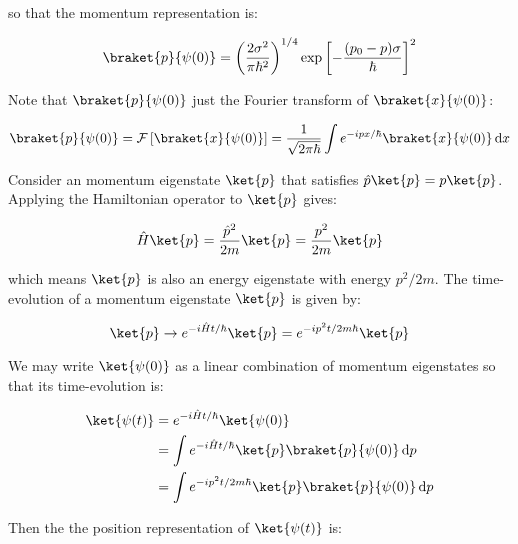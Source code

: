\documentclass[12pt]{article}
\begin{document}
so that the momentum representation is:

\begin{equation}
    \braket{p}{\psi(0)} = \left( \frac{2\sigma^{2}}{\pi \hbar^{2}} \right)^{1/4} \exp \left[ -\frac{(p_{0} - p)\sigma}{\hbar} \right]^{2}
\end{equation}

Note that $\braket{p}{\psi(0)}$ just the Fourier transform of $\braket{x}{\psi(0)}$:

\begin{equation}
    \braket{p}{\psi(0)} = \mathcal{F} \left[ \braket{x}{\psi(0)} \right] = \frac{1}{\sqrt{2\pi\hbar}} \int e^{-ipx/\hbar} \braket{x}{\psi(0)} \, \mathrm{d}x
\end{equation}

Consider an momentum eigenstate $\ket{p}$ that satisfies $\hat{p} \ket{p} = p \ket{p}$. Applying the Hamiltonian operator to $\ket{p}$ gives:

\begin{equation}
    \hat{H} \ket{p} = \frac{\hat{p}^{2}}{2m} \ket{p} = \frac{p^{2}}{2m} \ket{p}
\end{equation}

which means $\ket{p}$ is also an energy eigenstate with energy $p^{2}/2m$. The time-evolution of a momentum eigenstate $\ket{p}$ is given by:

\begin{equation}
    \ket{p} \to e^{-i\hat{H}t/\hbar} \ket{p} = e^{-ip^{2}t/2m\hbar} \ket{p}
\end{equation}

We may write $\ket{\psi(0)}$ as a linear combination of momentum eigenstates so that its time-evolution is:

\begin{equation}
\begin{split}
    \ket{\psi(t)} &= e^{-i\hat{H}t/\hbar} \ket{\psi(0)} \\
    &= \int e^{-i\hat{H}t/\hbar} \ket{p} \braket{p}{\psi(0)} \, \mathrm{d}p \\
    &= \int e^{-ip^{2}t/2m\hbar} \ket{p} \braket{p}{\psi(0)} \, \mathrm{d}p
\end{split}
\end{equation}

Then the the position representation of $\ket{\psi(t)}$ is:
\end{document}
